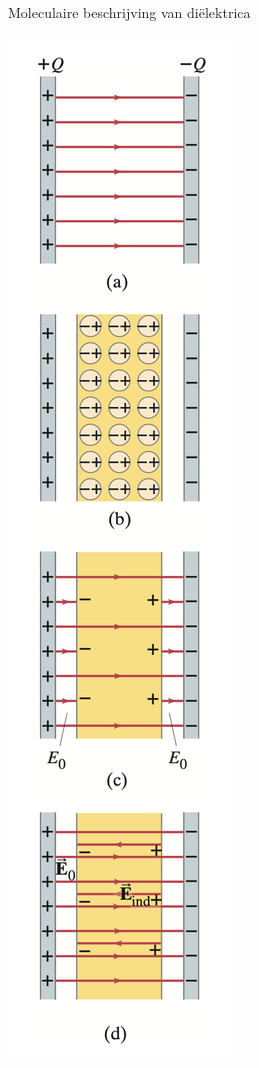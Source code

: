 \begin{app}{Moleculaire beschrijving van diëlektrica}
\begin{minipage}{.18\textwidth}
        \includegraphics[scale = 0.4]{Images/Elektriciteit/MoleculaireBeschrijvingVanDielektrica.png}
    \end{minipage}
\end{app}


